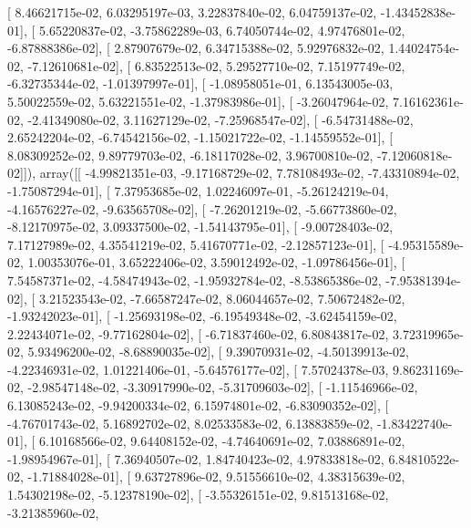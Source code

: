 \documentclass{article}
\begin{document}
       [  8.46621715e-02,   6.03295197e-03,   3.22837840e-02,
          6.04759137e-02,  -1.43452838e-01],
       [  5.65220837e-02,  -3.75862289e-03,   6.74050744e-02,
          4.97476801e-02,  -6.87888386e-02],
       [  2.87907679e-02,   6.34715388e-02,   5.92976832e-02,
          1.44024754e-02,  -7.12610681e-02],
       [  6.83522513e-02,   5.29527710e-02,   7.15197749e-02,
         -6.32735344e-02,  -1.01397997e-01],
       [ -1.08958051e-01,   6.13543005e-03,   5.50022559e-02,
          5.63221551e-02,  -1.37983986e-01],
       [ -3.26047964e-02,   7.16162361e-02,  -2.41349080e-02,
          3.11627129e-02,  -7.25968547e-02],
       [ -6.54731488e-02,   2.65242204e-02,  -6.74542156e-02,
         -1.15021722e-02,  -1.14559552e-01],
       [  8.08309252e-02,   9.89779703e-02,  -6.18117028e-02,
          3.96700810e-02,  -7.12060818e-02]]), array([[ -4.99821351e-03,  -9.17168729e-02,   7.78108493e-02,
         -7.43310894e-02,  -1.75087294e-01],
       [  7.37953685e-02,   1.02246097e-01,  -5.26124219e-04,
         -4.16576227e-02,  -9.63565708e-02],
       [ -7.26201219e-02,  -5.66773860e-02,  -8.12170975e-02,
          3.09337500e-02,  -1.54143795e-01],
       [ -9.00728403e-02,   7.17127989e-02,   4.35541219e-02,
          5.41670771e-02,  -2.12857123e-01],
       [ -4.95315589e-02,   1.00353076e-01,   3.65222406e-02,
          3.59012492e-02,  -1.09786456e-01],
       [  7.54587371e-02,  -4.58474943e-02,  -1.95932784e-02,
         -8.53865386e-02,  -7.95381394e-02],
       [  3.21523543e-02,  -7.66587247e-02,   8.06044657e-02,
          7.50672482e-02,  -1.93242023e-01],
       [ -1.25693198e-02,  -6.19549348e-02,  -3.62454159e-02,
          2.22434071e-02,  -9.77162804e-02],
       [ -6.71837460e-02,   6.80843817e-02,   3.72319965e-02,
          5.93496200e-02,  -8.68890035e-02],
       [  9.39070931e-02,  -4.50139913e-02,  -4.22346931e-02,
          1.01221406e-01,  -5.64576177e-02],
       [  7.57024378e-03,   9.86231169e-02,  -2.98547148e-02,
         -3.30917990e-02,  -5.31709603e-02],
       [ -1.11546966e-02,   6.13085243e-02,  -9.94200334e-02,
          6.15974801e-02,  -6.83090352e-02],
       [ -4.76701743e-02,   5.16892702e-02,   8.02533583e-02,
          6.13883859e-02,  -1.83422740e-01],
       [  6.10168566e-02,   9.64408152e-02,  -4.74640691e-02,
          7.03886891e-02,  -1.98954967e-01],
       [  7.36940507e-02,   1.84740423e-02,   4.97833818e-02,
          6.84810522e-02,  -1.71884028e-01],
       [  9.63727896e-02,   9.51556610e-02,   4.38315639e-02,
          1.54302198e-02,  -5.12378190e-02],
       [ -3.55326151e-02,   9.81513168e-02,  -3.21385960e-02,
\end{document}
